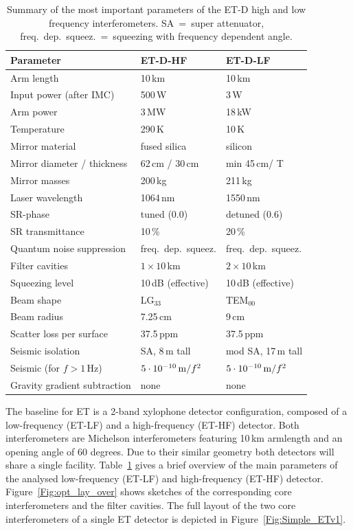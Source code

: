 \begin{table}
\begin{center}
\begin{tabular}{l l l}
\hline
\hline
Parameter & ET-D-HF   & ET-D-LF \\
\hline
Arm length & 10\,km & 10\,km \\
Input power (after IMC) & 500\,W & 3\,W \\
Arm power & 3\,MW & 18\,kW\\
Temperature & 290\,K &  10\,K  \\
Mirror material & fused silica & silicon \\
Mirror diameter / thickness & 62\,cm / 30\,cm & min 45\,cm/ T \\
Mirror masses & 200\,kg & 211\,kg \\
Laser wavelength & 1064\,nm & 1550\,nm \\
SR-phase & tuned (0.0) & detuned (0.6)\\
SR transmittance & 10\,\% & 20\,\% \\
Quantum noise suppression &  freq.\ dep.\ squeez.& freq.\ dep.\ squeez.\\
Filter cavities & $1 \times 10\,$km  & $2 \times 10\,$km\\
Squeezing level  & 10\,dB (effective) & 10\,dB (effective) \\
Beam shape &  LG$_{33}$& TEM$_{00}$\\
Beam radius & 7.25\,cm & 9\,cm \\
Scatter loss per surface & 37.5\,ppm & 37.5\,ppm \\
Seismic isolation & SA, 8\,m tall & mod SA, 17\,m tall \\
Seismic (for $f>1$\,Hz) & $5\cdot 10^{-10}\,{\rm m}/f^2$ & $5\cdot 10^{-10}\,{\rm m}/f^2$  \\
Gravity gradient subtraction & none & none \\
\hline
\hline
\end{tabular}
\caption{Summary of the most important parameters of the ET-D high and low frequency
interferometers. SA~=~super attenuator,  freq.\ dep.\ squeez.~=~squeezing
with frequency dependent angle.\label{tab:summary14}}
\end{center}
\end{table}

The baseline for ET is a 2-band xylophone detector configuration, composed of a
low-frequency (ET-LF) and a high-frequency (ET-HF) detector. Both interferometers
are Michelson interferometers featuring 10\,km armlength and an opening
angle of 60 degrees.  Due to their similar geometry both detectors will share
a single facility.
Table~\ref{tab:summary14} gives a brief overview of the main parameters
of the analysed low-frequency (ET-LF) and high-frequency (ET-HF) detector.
Figure~\ref{Fig:opt_lay_over}   shows sketches of the corresponding core
interferometers and the filter cavities. The full layout of the two core
interferometers of a single ET detector is depicted in Figure~\ref{Fig:Simple_ETv1}.


